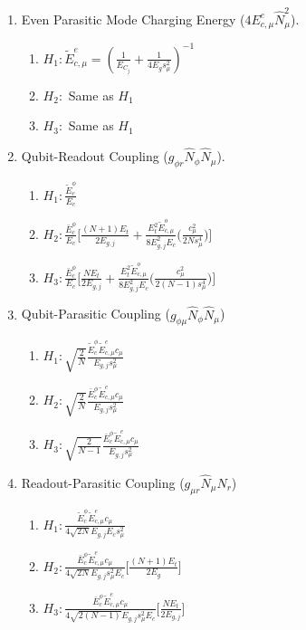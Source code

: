 \documentclass[%
reprint,
superscriptaddress,
 amsmath,amssymb,
 aps,
 prx,
longbibliography,
floatfix,
]{revtex4-2}
\begin{document}
\begin{enumerate}
\item Even Parasitic Mode Charging Energy  ($4E_{c,\mu}^e \hat N_{\mu}^2$). 
    \begin{enumerate}
    \item $H_1: \tilde{E}_{c,\mu}^{e}=(\frac{1}{E_{C_j}}+\frac{1}{4E_gs_\mu^2})^{-1}$ 
    \item $H_2:$ Same as $H_1$
    \item $H_3:$ Same as $H_1$
\end{enumerate}
     \item Qubit-Readout Coupling ($g_{\phi r}\hat N_\phi \hat N_\mu$).
    \begin{enumerate}
        \item $H_1: \frac{\tilde{E}_c^\phi}{E_c}$
        \item $H_2:\frac{\bar{E}_c^\phi}{E_c} \Big[\frac{(N+1)E_t}{2E_{g,j}}+\frac{E_t^2\tilde{E}_{c,\mu}^o}{8E_{g,j}^2E_c} \Big(\frac{c_\mu^2}{2Ns_\mu^4}\Big)\Big]$
        \item $H_3:\frac{\bar{E}_c^\phi}{E_c} \Big[\frac{NE_t}{2E_{g,j}}+\frac{E_t^2\tilde{E}_{c,\mu}^o}{8E_{g,j}^2E_c} \Big(\frac{c_\mu^2}{2(N-1)s_\mu^4}\Big)\Big]$
    \end{enumerate}
\item Qubit-Parasitic Coupling ($g_{\phi\mu}\hat N_\phi \hat N_\mu$)    
    \begin{enumerate}
        \item $H_1: \sqrt{\frac{2}{N}} \frac{\tilde{E}^\phi_c\tilde{E}^e_{c,\mu}c_\mu}{E_{g,j}s_\mu^2}$
        \item $H_2:\sqrt{\frac{2}{N}} \frac{\bar{E}^\phi_c\tilde{E}^{e}_{c,\mu}c_\mu}{E_{g,j}s_\mu^2}$
        \item $H_3:\sqrt{\frac{2}{N-1}} \frac{\bar{E}^\phi_c\tilde{E}^{e}_{c,\mu}c_\mu}{E_{g,j}s_\mu^2}$
    \end{enumerate}

\item Readout-Parasitic Coupling ($g_{\mu r}\hat N_\mu \hat N_r$)
    \begin{enumerate}
        \item $H_1: \frac{\tilde{E}^\phi_c\tilde{E}^e_{c,\mu}c_\mu}{4\sqrt{2N}E_{g,j}E_cs_\mu^2}$
        \item $H_2:\frac{\bar{E}^\phi_c\tilde{E}^{e}_{c,\mu}c_\mu }{4\sqrt{2N}E_{g,j}s_\mu^2E_c}\Big[\frac{(N+1)E_t}{2E_g} \Big]$
        \item $H_3:\frac{\bar{E}^\phi_c\tilde{E}^{e}_{c,\mu}c_\mu }{4\sqrt{2(N-1)}E_{g,j}s_\mu^2E_c}\Big[\frac{NE_t}{2E_{g,j}} \Big]$
    \end{enumerate}
   
\end{enumerate}
\end{document}
